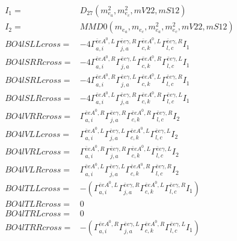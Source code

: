 \documentclass[A4,landscape]{article}
\begin{document}
\begin{align} 
I_1 = & D_{27}(m^2_{e_{{a}}}, m^2_{e_{{c}}}, mV22, mS12) \\ 
I_2 = & MMD0(m_{e_{{a}}}, m_{e_{{c}}}, m^2_{e_{{a}}}, m^2_{e_{{c}}}, mV22, mS12) \\ 
  BO4lSLLcross= & -4  \Gamma^{\bar{e}e A^0 ,L}_{a, i} \Gamma^{\bar{e}e \gamma ,R}_{j, a} \Gamma^{\bar{e}e A^0 ,L}_{c, k} \Gamma^{\bar{e}e \gamma ,R}_{l, c} I_1 \\ 
  BO4lSRRcross= & -4  \Gamma^{\bar{e}e A^0 ,R}_{a, i} \Gamma^{\bar{e}e \gamma ,L}_{j, a} \Gamma^{\bar{e}e A^0 ,R}_{c, k} \Gamma^{\bar{e}e \gamma ,L}_{l, c} I_1 \\ 
  BO4lSRLcross= & -4  \Gamma^{\bar{e}e A^0 ,R}_{a, i} \Gamma^{\bar{e}e \gamma ,L}_{j, a} \Gamma^{\bar{e}e A^0 ,L}_{c, k} \Gamma^{\bar{e}e \gamma ,R}_{l, c} I_1 \\ 
  BO4lSLRcross= & -4  \Gamma^{\bar{e}e A^0 ,L}_{a, i} \Gamma^{\bar{e}e \gamma ,R}_{j, a} \Gamma^{\bar{e}e A^0 ,R}_{c, k} \Gamma^{\bar{e}e \gamma ,L}_{l, c} I_1 \\ 
  BO4lVRRcross= &  \Gamma^{\bar{e}e A^0 ,R}_{a, i} \Gamma^{\bar{e}e \gamma ,R}_{j, a} \Gamma^{\bar{e}e A^0 ,R}_{c, k} \Gamma^{\bar{e}e \gamma ,R}_{l, c} I_2 \\ 
  BO4lVLLcross= &  \Gamma^{\bar{e}e A^0 ,L}_{a, i} \Gamma^{\bar{e}e \gamma ,L}_{j, a} \Gamma^{\bar{e}e A^0 ,L}_{c, k} \Gamma^{\bar{e}e \gamma ,L}_{l, c} I_2 \\ 
  BO4lVRLcross= &  \Gamma^{\bar{e}e A^0 ,R}_{a, i} \Gamma^{\bar{e}e \gamma ,R}_{j, a} \Gamma^{\bar{e}e A^0 ,L}_{c, k} \Gamma^{\bar{e}e \gamma ,L}_{l, c} I_2 \\ 
  BO4lVLRcross= &  \Gamma^{\bar{e}e A^0 ,L}_{a, i} \Gamma^{\bar{e}e \gamma ,L}_{j, a} \Gamma^{\bar{e}e A^0 ,R}_{c, k} \Gamma^{\bar{e}e \gamma ,R}_{l, c} I_2 \\ 
  BO4lTLLcross= & -( \Gamma^{\bar{e}e A^0 ,L}_{a, i} \Gamma^{\bar{e}e \gamma ,R}_{j, a} \Gamma^{\bar{e}e A^0 ,L}_{c, k} \Gamma^{\bar{e}e \gamma ,R}_{l, c} I_1) \\ 
  BO4lTLRcross= & 0 \\ 
  BO4lTRLcross= & 0 \\ 
  BO4lTRRcross= & -( \Gamma^{\bar{e}e A^0 ,R}_{a, i} \Gamma^{\bar{e}e \gamma ,L}_{j, a} \Gamma^{\bar{e}e A^0 ,R}_{c, k} \Gamma^{\bar{e}e \gamma ,L}_{l, c} I_1) \\ 
\end{align} 
\end{document}
